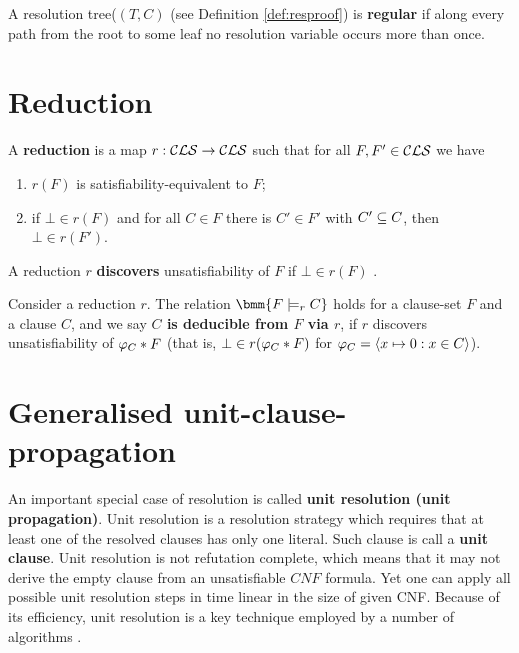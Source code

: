 \documentclass[12pt]{book}
\begin{document}
\begin{defi}\label{def:regres}
  A resolution tree($(T,C)$ (see Definition \ref{def:resproof}) is \textbf{regular} if along every path from the root to some leaf no resolution variable occurs more than once.
\end{defi}
\section{Reduction}
\label{sec:Reduction}
\begin{defi}\label{def:red}
   A \textbf{reduction} is a map $r: \mathcal{CLS} \rightarrow \mathcal{CLS}$ such that for all $F, F' \in \mathcal{CLS}$ we have
  \begin{enumerate}
  \item $r(F)$ is satisfiability-equivalent to $F$;
  \item if $\bot \in r(F)$ and for all $C \in F$ there is $C' \in  F'$ with $C' \subseteq C$, then $\bot \in r(F')$.
  \end{enumerate}
  A reduction $r$ \textbf{discovers} unsatisfiability of $F$ if $\bot \in r(F)$ \cite{h10}.
\end{defi}

\begin{defi}\label{def:implication}
  Consider a reduction $r$. The relation $\bmm{F \models_r C}$ holds for a clause-set $F$ and a clause $C$, and we say \textbf{$C$ is deducible from $F$ via $r$}, if $r$ 
  discovers unsatisfiability of $\varphi_C * F$ (that is, $\bot \in r(\varphi_C * F)$ for $\varphi_C = \langle x \mapsto 0 : x \in C \rangle$).
\end{defi}

\section{Generalised unit-clause-propagation}
\label{sec:rkred}

An important special case of resolution is called \textbf{unit resolution (unit propagation)}. Unit resolution is a resolution strategy 
which requires that at least one of the resolved clauses has only one literal. Such clause is call a \textbf{unit clause}. Unit resolution 
is not refutation complete, which means that it may not derive the empty clause from an unsatisfiable $CNF$ formula. Yet one can apply all 
possible unit resolution steps in time linear in the size of given CNF. Because of its efficiency, unit resolution is a key technique 
employed by a number of algorithms \cite{h6}.
\end{document}
